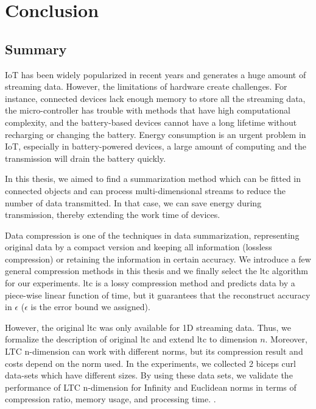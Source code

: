 \chapter{Conclusion}


\section{Summary}


IoT has been widely popularized in recent years and generates a huge amount of
streaming data. However, the limitations of hardware create challenges. For
instance, connected devices lack enough memory to store all the streaming data,
the micro-controller has trouble with methods that have high computational
complexity, and the battery-based devices cannot have a long lifetime without
recharging or changing the battery. Energy consumption is an urgent problem in
IoT, especially in battery-powered devices, a large amount of computing and the
transmission will drain the battery quickly.

In this thesis, we aimed to find a summarization method which can be fitted in
connected objects and can process multi-dimensional streams to reduce the number
of data transmitted. In that case, we can save energy during transmission,
thereby extending the work time of devices.

Data compression is one of the techniques in data summarization, representing
original data by a compact version and keeping all information (lossless
compression) or retaining the information in certain accuracy. We introduce a
few general compression methods in this thesis and we finally select the
\acrfull{ltc} algorithm for our experiments. \acrshort{ltc} is a lossy
compression method and predicts data by a piece-wise linear function of time,
but it guarantees that the reconstruct accuracy in $\epsilon$ ($\epsilon$ is the
error bound we assigned). 

However, the original \acrshort{ltc} was only available for 1D streaming data.
Thus, we formalize the description of original \acrshort{ltc} and extend
\acrshort{ltc} to dimension $n$. Moreover, LTC n-dimension can work with
different norms, but its compression result and costs depend on the norm used.
In the experiments, we collected 2 biceps curl data-sets which have different
sizes. By using these data sets, we validate the performance of LTC n-dimension
for Infinity and Euclidean norms in terms of compression ratio, memory usage,
and processing time.
.

